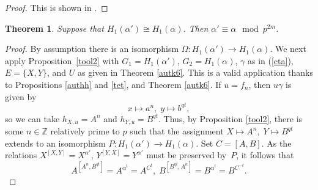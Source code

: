 \documentclass{amsart}
\newtheorem{theorem}{Theorem}[section]
\theoremstyle{definition}
\theoremstyle{remark}
\newcommand \Z{{\mathbb Z}}
\begin{document}
\begin{proof} This is shown in \cite[Theorem 2.7]{MS2}.
\end{proof}

\begin{theorem}\label{exel} Suppose that
$H_1(\alpha')\cong H_1(\alpha)$. Then $\alpha'\equiv\alpha\mod p^{2m}$.
\end{theorem}

\begin{proof} By assumption there is an isomorphism $\Omega:H_1(\alpha')\to H_1(\alpha)$. We next apply Proposition~\ref{tool2}
with $G_1=H_1(\alpha')$, $G_2=H_1(\alpha)$, $\gamma$ as in (\ref{cta}), $E=\{X,Y\}$, and $U$ as given in Theorem \ref{autk6}.
This is a valid application thanks to Propositions \ref{authh} and \ref{tet}, and Theorem \ref{autk6}. If $u=f_n$, then
$u\gamma$ is given by
\begin{equation}
\label{cra}
x\mapsto a^n,\; y\mapsto b^{qt},
\end{equation}
so we can take $h_{X,u}=A^n$ and $h_{Y,u}=B^{qt}$. Thus, by Proposition \ref{tool2}, there is some $n\in\Z$ relatively
prime to $p$ such that the assignment $X\mapsto A^n,\; Y\mapsto B^{qt}$ extends to an isomorphism $P:H_1(\alpha')\to H_1(\alpha)$.
Set $C=[A,B]$. As the relations $X^{[X,Y]}=X^{\alpha'},\, Y^{[Y,X]}=Y^{\alpha'}$ must be preserved by~$P$, it follows that
\begin{equation}
\label{pin}
A^{[A^n,B^{qt}]}=A^{\alpha^t}=A^{C^t},\; B^{[B^{qt},A^n]}=B^{\alpha^t}=B^{C^{-t}}.
\end{equation}


\end{proof}
\end{document}
